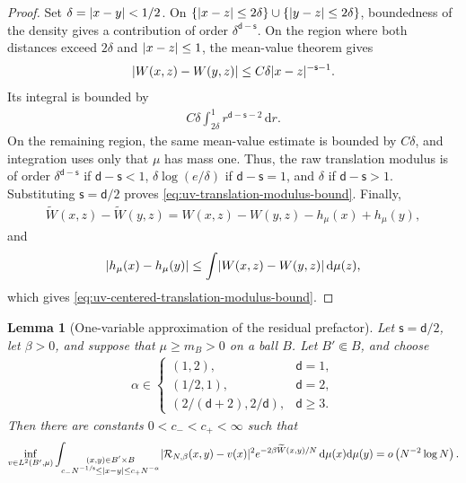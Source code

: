 \documentclass[11pt,reqno]{amsart}
\numberwithin{equation}{section}
\theoremstyle{plain}
\newtheorem{lemma}[lemma]{Lemma}
\theoremstyle{remark}
\DeclarePairedDelimiter{\abs}{\lvert}{\rvert}
\renewcommand{\d}{\mathsf{d}}
\newcommand{\md}{\mathrm{d}}
\newcommand{\tl}{\widetilde}
\newcommand{\be}{\beta}
\newcommand{\s}{\mathsf{s}}
\begin{document}
\begin{proof}
Set \(\delta=\abs{x-y}<1/2\).  On
\(\{\abs{x-z}\le2\delta\}\cup\{\abs{y-z}\le2\delta\}\), boundedness of the density gives a contribution of order \(\delta^{\d-\s}\).  On the region where both distances exceed \(2\delta\) and \(\abs{x-z}\le1\), the mean-value theorem gives
\begin{align}\label{eq:uv-riesz-mean-value-bound}
 \abs{W(x,z)-W(y,z)}
 \le C\delta\abs{x-z}^{-\s-1}.
\end{align}
Its integral is bounded by
\begin{align}\label{eq:uv-riesz-intermediate-integral}
 C\delta\int_{2\delta}^1r^{\d-\s-2}\,\md r.
\end{align}
On the remaining region, the same mean-value estimate is bounded by \(C\delta\), and integration uses only that \(\mu\) has mass one.  Thus, the raw translation modulus is of order \(\delta^{\d-\s}\) if \(\d-\s<1\), \(\delta\log(e/\delta)\) if \(\d-\s=1\), and \(\delta\) if \(\d-\s>1\).  Substituting \(\s=\d/2\) proves \eqref{eq:uv-translation-modulus-bound}.  Finally,
\begin{align}\label{eq:uv-centered-translation-identity}
 \tl W(x,z)-\tl W(y,z)
 =W(x,z)-W(y,z)-h_\mu(x)+h_\mu(y),
\end{align}
and
\begin{align}\label{eq:uv-potential-translation-bound}
 \abs{h_\mu(x)-h_\mu(y)}
 \le\int\abs{W(x,z)-W(y,z)}\,\md\mu(z),
\end{align}
which gives \eqref{eq:uv-centered-translation-modulus-bound}.
\end{proof}

\begin{lemma}[One-variable approximation of the residual prefactor]
\label{lem:uv-critical-residual-prefactor}
Let \(\s=\d/2\), let \(\be>0\), and suppose that \(\mu\ge m_B>0\) on a ball \(B\).  Let \(B'\Subset B\), and choose
\begin{align}\label{eq:uv-prefactor-alpha-range}
 \alpha\in
 \begin{cases}
 (1,2),&\d=1,\\
 (1/2,1),&\d=2,\\
 (2/(\d+2),2/\d),&\d\ge3.
 \end{cases}
\end{align}
Then there are constants \(0<c_-<c_+<\infty\) such that
\begin{align}\label{eq:uv-prefactor-one-variable-approximation}
 \inf_{v\in L^2(B',\mu)}
 \int_{\substack{(x,y)\in B'\times B\\
 c_-N^{-1/\s}\le\abs{x-y}\le c_+N^{-\alpha}}}
 \abs{\mathcal R_{N,\be}(x,y)-v(x)}^2
 e^{-2\be\tl W(x,y)/N}\,\md\mu(x)\md\mu(y)
 =o\left(N^{-2}\log N\right).
\end{align}
\end{lemma}
\end{document}
